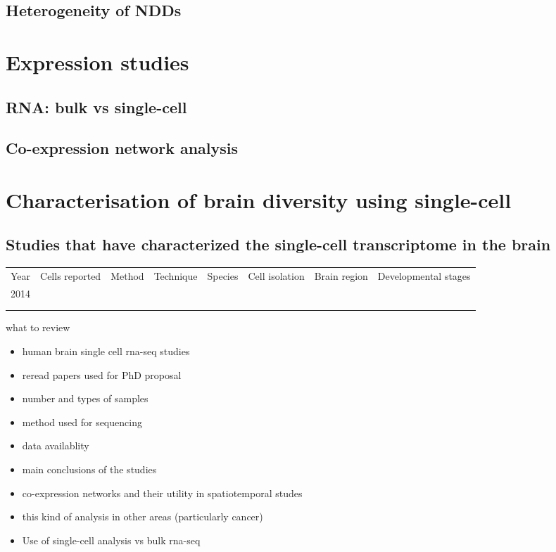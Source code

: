 \documentclass[12pt]{article}
\begin{document}
\subsection{Heterogeneity of NDDs}
\section{Expression studies}
\subsection{RNA: bulk vs single-cell}
\subsection{Co-expression network analysis}

\section{Characterisation of brain diversity using single-cell}
\subsection{Studies that have characterized the single-cell transcriptome in the brain}

\begin{table}[]
	\begin{tabular}{llllllll}
		Year & Cells reported  & Method  & Technique  & Species  &  Cell isolation & Brain region & Developmental stages\\
		2014 &  &  &  & & & & \\
		&  &  &  & &&& \\
		&  &  &  & &&&
	\end{tabular}
\end{table}


what to review

\begin{itemize}
	\item human brain single cell rna-seq studies 
	\item reread papers used for PhD proposal 
	\item number and types of samples 
	\item method used for sequencing 
	\item data availablity 
	\item main conclusions of the studies
	\item co-expression networks and their utility in spatiotemporal studes 
	\item this kind of analysis in other areas (particularly cancer)
	\item Use of single-cell analysis vs bulk rna-seq 
\end{itemize}
\end{document}
